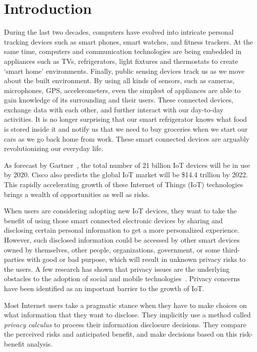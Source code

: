 \chapter{Introduction}\label{chapter:intro}
 
During the last two decades, computers have evolved into intricate personal tracking devices such as smart phones, smart watches, and fitness trackers. At the same time, computers and communication technologies are being embedded in appliances such as TVs, refrigerators, light fixtures and thermostats to create `smart home' environments. Finally, public sensing devices track us as we move about the built environment. By using all kinds of sensors, such as cameras, microphones, GPS, accelerometers, even the simplest of appliances are able to gain knowledge of its surrounding and their users. These connected devices, exchange data with each other, and further interact with our day-to-day activities. It is no longer surprising that our smart refrigerator knows what food is stored inside it and notify us that we need to buy groceries when we start our cars as we go back home from work. These smart connected devices are arguably revolutionizing our everyday life.

As forecast by Gartner~\cite{van_der_meulen_gartner_nodate}, the total number of 21 billion IoT devices will be in use by 2020. Cisco also predicts the global IoT market will be \$14.4 trillion by 2022. This rapidly accelerating growth of these Internet of Things (IoT) technologies brings a wealth of opportunities as well as risks. 

When users are considering adopting new IoT devices, they want to take the benefit of using those smart connected electronic devices by sharing and disclosing certain personal information to get a more personalized experience. However, such disclosed information could be accessed by other smart devices owned by themselves, other people, organizations, government, or some third-parties with good or bad purpose, which will result in unknown privacy risks to the users. A few research has shown that privacy issues are the underlying obstacles to the adoption of social and mobile technologies~\cite{}. Privacy concerns have been identified as an important barrier to the growth of IoT.

Most Internet users take a pragmatic stance when they have to make choices on what information that they want to disclose. They implicitly use a method called \textit{privacy calculus} to process their information disclosure decisions. They compare the perceived risks and anticipated benefit, and make decisions based on this risk-benefit analysis.

